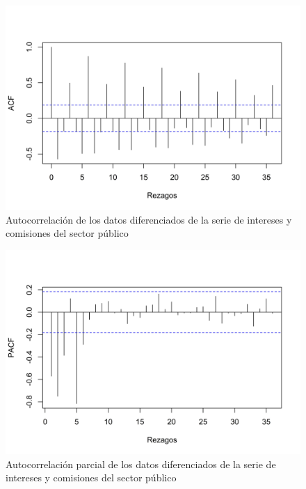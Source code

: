 \documentclass[
]{article}
\begin{document}
\begin{figure}[H]
\includegraphics[width=1\linewidth,height=1\textheight]{Tesis_files/figure-latex/intereses_acf-1} \caption{Autocorrelación de los datos diferenciados de la serie de intereses y comisiones del sector público}\label{fig:intereses_acf}
\end{figure}

\begin{figure}[H]
\includegraphics[width=1\linewidth,height=1\textheight]{Tesis_files/figure-latex/intereses_pacf-1} \caption{Autocorrelación parcial de los datos diferenciados de la serie de intereses y comisiones del sector público}\label{fig:intereses_pacf}
\end{figure}
\end{document}
